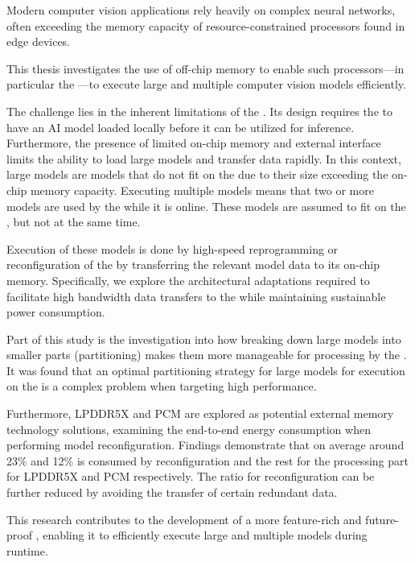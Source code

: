 Modern computer vision applications rely heavily on complex neural networks, often exceeding the memory capacity of resource-constrained processors found in edge devices.

This thesis investigates the use of off-chip memory to enable such processors---in particular the \graicore{}---to execute large and multiple computer vision models efficiently.

The challenge lies in the inherent limitations of the \graicore{}.
Its design requires the \graicore{} to have an AI model loaded locally before it can be utilized for inference.
Furthermore, the presence of limited on-chip memory and external interface limits the ability to load large models and transfer data rapidly.
In this context, large models are models that do not fit on the \graicore{} due to their size exceeding the on-chip memory capacity.
Executing multiple models means that two or more models are used by the \graicore{} while it is online.
These models are assumed to fit on the \graicore{}, but not at the same time.

Execution of these models is done by high-speed reprogramming or reconfiguration of the \graicore{} by transferring the relevant model data to its on-chip memory.
Specifically, we explore the architectural adaptations required to facilitate high bandwidth data transfers to the \graicore{} while maintaining sustainable power consumption.

Part of this study is the investigation into how breaking down large models into smaller parts (partitioning) makes them more manageable for processing by the \graicore{}.
It was found that an optimal partitioning strategy for large models for execution on the \graicore{} is a complex problem when targeting high performance.

Furthermore, LPDDR5X and PCM are explored as potential external memory technology solutions, examining the end-to-end energy consumption when performing model reconfiguration.
Findings demonstrate that on average around 23\% and 12\% is consumed by reconfiguration and the rest for the processing part for LPDDR5X and PCM respectively.
The ratio for reconfiguration can be further reduced by avoiding the transfer of certain redundant data. %

This research contributes to the development of a more feature-rich and future-proof \graicore{}, enabling it to efficiently execute large and multiple models during runtime.
